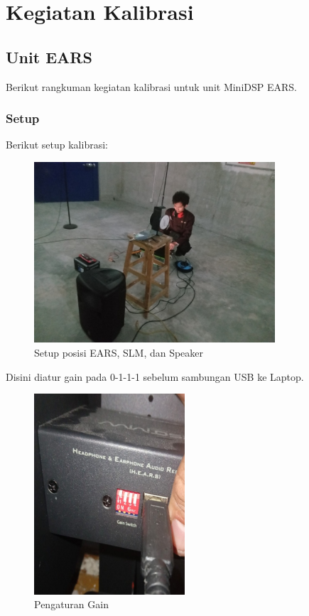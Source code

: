 \documentclass{article}
\begin{document}
	\newpage
	\section{Kegiatan Kalibrasi}

	\subsection{Unit EARS}

	Berikut rangkuman kegiatan kalibrasi untuk unit MiniDSP EARS.

	\subsubsection{Setup}

	Berikut setup kalibrasi:

	\begin{figure}[H]
		\centering
		\includegraphics[width=0.8\textwidth,angle=0]{images/ears_setup}
		\caption{Setup posisi EARS, SLM, dan Speaker}
	\end{figure}

	Disini diatur gain pada 0-1-1-1 sebelum sambungan USB ke Laptop.

	\begin{figure}[H]
		\centering
		\includegraphics[width=0.5\textwidth,angle=-90]{images/ears_gain}
		\caption{Pengaturan Gain}
	\end{figure}
\end{document}
